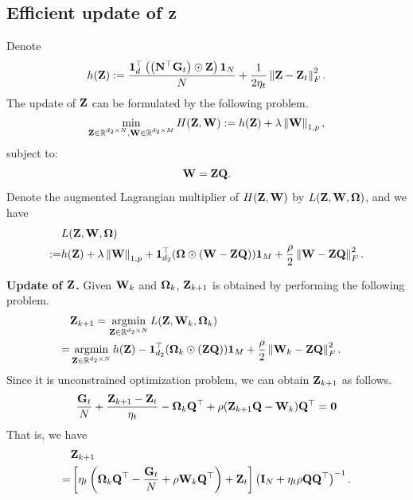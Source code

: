 \documentclass[journal]{IEEEtran}
\begin{document}
\subsection{Efficient update of ${\bf Z}$} 

Denote 
\begin{align}
\nonumber
h({\bf Z}) :=  \frac{{\bf 1}_d^\top\left( \left( {\bf N}^\top{\bf G}_t \right) \odot {\bf Z} \right){\bf 1}_N}{N} + \frac{1}{2\eta_t}\left\lVert{\bf Z} - {\bf Z}_t\right\rVert_F^2.
\end{align} The update of ${\bf Z}$ can be formulated by the following problem.
\begin{align}
\nonumber
\min_{\substack{{\bf Z}\in\mathbb{R}^{d_2\times N}, {\bf W}\in\mathbb{R}^{d_2\times M}}} H({\bf Z}, {\bf W}) := h({\bf Z}) + \lambda \left\lVert{\bf W}\right\rVert_{1,p},
\end{align} subject to:
\begin{align}
\nonumber
{\bf W} = {\bf Z}{\bf Q}.
\end{align} Denote the augmented Lagrangian multiplier of $H({\bf Z}, {\bf W})$ by $L({\bf Z}, {\bf W}, \boldsymbol{\Omega})$, and we have 
\begin{align}
\nonumber
& L({\bf Z}, {\bf W}, \boldsymbol{\Omega}) \\ \nonumber
:= & h({\bf Z}) + \lambda \left\lVert{\bf W}\right\rVert_{1,p} + {\bf 1}_{d_2}^\top(\boldsymbol{\Omega} \odot ({\bf W} - {\bf Z}{\bf Q})){\bf 1}_M + \frac{\rho}{2}\left\lVert{\bf W} - {\bf Z}{\bf Q}\right\rVert_F^2.
\end{align} 

\textbf{Update of ${\bf Z}$.} Given ${\bf W}_k$ and $\boldsymbol{\Omega}_k$, ${\bf Z}_{k+1}$ is obtained by performing the following problem.
\begin{align}
\nonumber
& \Z_{k+1}  = \argmin_{\Z\in\RR^{d_2\times N}} L(\Z, \W_k, \bOmega_k) & \\ \nonumber
= & \argmin_{\Z\in\RR^{d_2\times N}} h(\Z) - \1_{d_2}^\top(\bOmega_k \odot  (\Z\Q))\1_M + \frac{\rho}{2}\lrnorm{\W_k - \Z\Q}_F^2.
\end{align} Since it is unconstrained optimization problem, we can obtain ${\bf Z}_{k+1}$ as follows.
\begin{align}
\nonumber
\frac{{\bf G}_t}{N} + \frac{{\bf Z}_{k+1} - {\bf Z}_t}{\eta_t} -\boldsymbol{\Omega}_k{\bf Q}^\top + \rho ({\bf Z}_{k+1}{\bf Q} - {\bf W}_k){\bf Q}^\top = {\bf 0}
\end{align} That is, we have 
\begin{align}
\nonumber
& {\bf Z}_{k+1} \\ \nonumber
= & \left [ \eta_t\left( \boldsymbol{\Omega}_k{\bf Q}^\top-\frac{{\bf G}_t}{N}+\rho{\bf W}_k{\bf Q}^\top \right)+{\bf Z}_t \right ]\left( {\bf I}_N+\eta_t\rho{\bf Q}{\bf Q}^\top \right)^{-1}.
\end{align}
\end{document}
